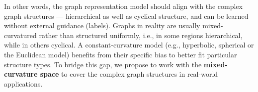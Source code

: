 In other words, the graph representation model should align with the complex graph structures 
— hierarchical as well as cyclical structure, 
and can be learned without external guidance (labels). 
Graphs in reality are usually mixed-curvatured rather than structured uniformly, i.e., in some regions hierarchical, while in others cyclical.
A constant-curvature model (e.g., hyperbolic, spherical or the Euclidean model) benefits from their specific bias to better fit particular structure types. 
To bridge this gap, we propose to work with the \textbf{mixed-curvature space} to cover the  complex graph structures in real-world applications.


